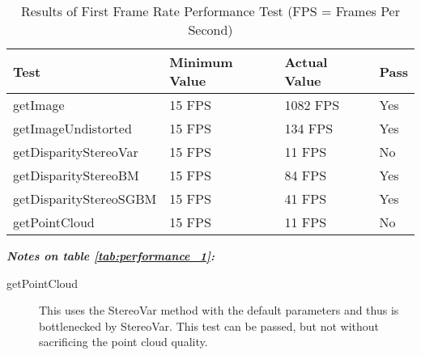 \begin{table}[h]
\centering
\small
\begin{tabular}{llll}
\hline
\textbf{Test} & \textbf{Minimum Value} & \textbf{Actual Value} & \textbf{Pass}
\\ \hline
getImage                  & 15 FPS                 & 1082 FPS            & Yes           \\ 
getImageUndistorted       & 15 FPS                 & 134 FPS             & Yes           \\ 
getDisparityStereoVar     & 15 FPS                 & 11 FPS              & No            \\ 
getDisparityStereoBM      & 15 FPS                 & 84 FPS              & Yes           \\ 
getDisparityStereoSGBM    & 15 FPS                 & 41 FPS              & Yes           \\ 
getPointCloud             & 15 FPS                 & 11 FPS              & No            \\ \hline
\end{tabular}
\caption{Results of First Frame Rate Performance Test (FPS = Frames Per Second)\protect {\label{tab:performance_2}}}
\end{table}

\textbf{\textit{Notes on table \ref{tab:performance_1}:}}
\begin{description}
	\item[getPointCloud] This uses the StereoVar method with the default parameters and thus is bottlenecked by StereoVar.
	This test can be passed, but not without sacrificing the point cloud quality.
	
\end{description}